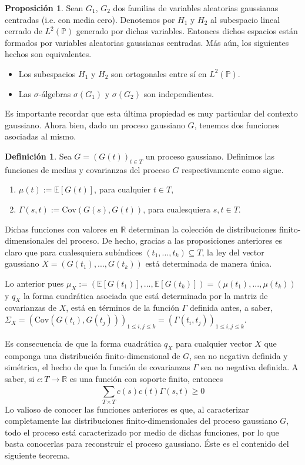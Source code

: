\documentclass[letterpaper,twoside,12pt]{book}
\newcommand{\R}{\mathbb{R}}
\newcommand{\E}{\mathbb{E}}
\renewcommand{\P}{\mathbb{P}}
\newcommand{\1}{\mathds{1}}
\renewcommand{\to}{\rightarrow}
\theoremstyle{definition}
\newtheorem{dfn}{Definición}
\theoremstyle{definition}
\theoremstyle{remark}
\theoremstyle{definition}
\theoremstyle{definition}
\newtheorem{prop}{Proposición}
\theoremstyle{definition}
\theoremstyle{definition}
\theoremstyle{definition}
\begin{document}
\begin{prop}\label{Gaussi_indep} 
 Sean $G_1$, $G_2$ dos familias de variables aleatorias gaussianas centradas (i.e. con media cero). Denotemos por $H_1$ y $H_2$ al subespacio lineal cerrado de $L^{2}(\P)$ generado por dichas variables. Entonces dichos espacios están formados por variables aleatorias gaussianas centradas. Más aún, los siguientes hechos son equivalentes.
 \begin{itemize}
    \item Los subespacios $H_1$ y $H_2$ son ortogonales entre sí en $L^{2}(\P)$.
    \item Las $\sigma$-álgebras $\sigma(G_1)$ y $\sigma(G_2)$ son independientes.
 \end{itemize}
 \end{prop}
 Es importante recordar que esta última propiedad es muy particular del contexto gaussiano. Ahora bien, dado un proceso gaussiano $G$, tenemos dos funciones asociadas al mismo.
\begin{dfn} 
 Sea $G=(G(t))_{t\in T}$ un proceso gaussiano. Definimos las funciones de medias y covarianzas del proceso $G$ respectivamente como sigue.
 \begin{enumerate}
    \item $\mu(t):=\E\left[G(t)\right]$, \qquad para cualquier $t\in T$,
    \item $\Gamma(s,t):= \text{Cov}\left(G(s),G(t)\right)$, \qquad para cualesquiera $s,t\in T$.
 \end{enumerate}
 \end{dfn}
Dichas funciones con valores en $\R$ determinan la colección de distribuciones finito-dimensionales del proceso. 
De hecho, gracias a las proposiciones anteriores es claro que para cualesquiera subíndices $(t_1,...,t_k)\subseteq T$, la ley del vector gaussiano $X=(G(t_1),...,G(t_k))$ está determinada de manera única. 

Lo anterior pues $\mu_X:=(\E\left[G(t_1)\right],...,\E\left[G(t_k)\right])=(\mu(t_1),...,\mu(t_k))$ y $q_X$ la forma cuadrática asociada que está determinada por la matriz de covarianzas de $X$, está en términos de la función $\Gamma$ definida antes, a saber, $\Sigma_X=\left(\text{Cov}\left(G(t_i),G(t_j)\right)\right)_{1\leq i,j\le k}=\left(\Gamma(t_i,t_j)\right)_{1\le i,j\le k }$.

Es consecuencia de que la forma cuadrática $q_X$ para cualquier vector $X$ que componga una distribución finito-dimensional de $G$, sea no negativa definida y simétrica, el hecho de que la función de covarianzas $\Gamma$ sea no negativa definida. A saber, si $c:T\to \R$ es una función con soporte finito, entonces 
\[  
    \sum_{T\times T}^{}c(s)c(t)\Gamma(s,t)\geq0
\]
Lo valioso de conocer las funciones anteriores es que, al caracterizar completamente las distribuciones finito-dimensionales del proceso gaussiano $G$, todo el proceso está caracterizado por medio de dichas funciones, por lo que basta conocerlas para reconstruir el proceso gaussiano. Éste es el contenido del siguiente teorema.
\end{document}
